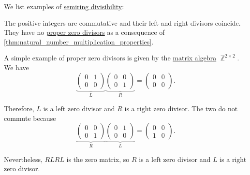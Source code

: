 \begin{example}\label{ex:def:semiring_divisibility}
  We list examples of \hyperref[def:semiring_divisibility]{semiring divisibility}:
  \begin{thmenum}
     The positive integers are commutative and their left and right divisors coincide. They have no \hyperref[def:semiring_divisibility/zero]{proper zero divisors} as a consequence of \cref{thm:natural_number_multiplication_properties}.

     A simple example of proper zero divisors is given by the \hyperref[thm:matrix_algebra]{matrix algebra} \( \BbbZ^{2 \times 2} \). We have
    \begin{equation*}
      \underbrace
      {
        \begin{pmatrix}
          0 & 1 \\
          0 & 0
        \end{pmatrix}
      }_{L}
      \underbrace
      {
        \begin{pmatrix}
          0 & 0 \\
          0 & 1
        \end{pmatrix}
      }_{R}
      =
      \begin{pmatrix}
        0 & 0 \\
        0 & 0
      \end{pmatrix}.
    \end{equation*}

    Therefore, \( L \) is a left zero divisor and \( R \) is a right zero divisor. The two do not commute because
    \begin{equation*}
      \underbrace
      {
        \begin{pmatrix}
          0 & 0 \\
          0 & 1
        \end{pmatrix}
      }_{R}
      \underbrace
      {
        \begin{pmatrix}
          0 & 1 \\
          0 & 0
        \end{pmatrix}
      }_{L}
      =
      \begin{pmatrix}
        0 & 0 \\
        1 & 0
      \end{pmatrix}.
    \end{equation*}

    Nevertheless, \( RLRL \) is the zero matrix, so \( R \) is a left zero divisor and \( L \) is a right zero divisor.


\end{thmenum}
\end{example}
